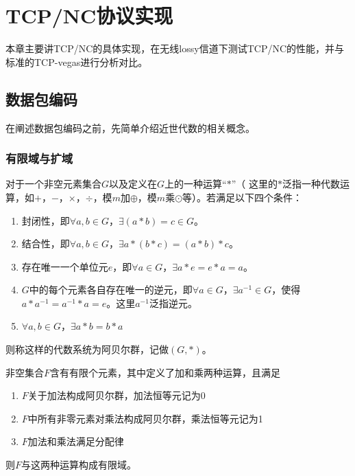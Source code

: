 \chapter{TCP/NC协议实现}
本章主要讲TCP/NC的具体实现，在无线lossy信道下测试TCP/NC的性能，并与标准的TCP-vegas进行分析对比。
\section{数据包编码}
在阐述数据包编码之前，先简单介绍近世代数的相关概念。
\subsection{有限域与扩域}
\begin{myDef}[阿贝尔群]
	对于一个非空元素集合$G$以及定义在$G$上的一种运算“$*$”（ 这里的$*$泛指一种代数运算，如$+$，$-$，$\times$，$\div$，模$m$加$\oplus$，模$m$乘$\odot$等）。若满足以下四个条件：
	\begin{enumerate}[fullwidth,itemindent=2em,label=(\arabic*)]
		\item 封闭性，即$\forall a,b \in G$，$\exists\left(a*b\right)=c\in G$。
		\item 结合性，即$\forall a,b \in G$，$\exists a*\left(b*c\right)=\left(a*b\right)*c$。
		\item 存在唯一一个单位元$e$，即$\forall a \in G$，$\exists a*e=e*a=a$。
		\item $G$中的每个元素各自存在唯一的逆元，即$\forall a \in G$，$\exists {a^{ - 1}} \in G$，使得$a*{a^{-1}}={a^{-1}}*a=e$。这里${a^{-1}}$泛指逆元。
		\item $\forall a,b \in G$，$\exists a*b=b*a$
	\end{enumerate}
	\par
	则称这样的代数系统为阿贝尔群，记做$\left(G,*\right)$\textsuperscript{\cite{zzc2003}}。
\end{myDef}
\begin{myDef}[有限域]
	非空集合$F$含有有限个元素，其中定义了加和乘两种运算，且满足
	\begin{enumerate}[fullwidth,itemindent=2em,label=(\arabic*)]
		\item $F$关于加法构成阿贝尔群，加法恒等元记为0
		\item $F$中所有非零元素对乘法构成阿贝尔群，乘法恒等元记为1
		\item $F$加法和乘法满足分配律
	\end{enumerate}
	\par
	则$F$与这两种运算构成有限域\textsuperscript{\cite{zzc2003}}。
\end{myDef}
